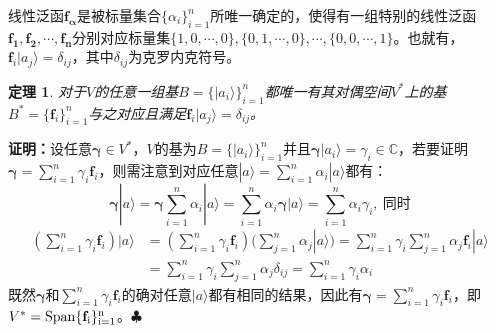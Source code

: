 \documentclass[mathserif,hyperref,UTF8,openany,b5paper]{ctexbook}
\newtheorem{thm}{定理}[section]
\begin{document}
线性泛函$\mathbf{f_\alpha}$是被标量集合$\{\alpha_i\}^n_{i=1}$所唯一确定的，使得有一组特别的线性泛函$\mathbf{f_1},\mathbf{f_2},\cdots,\mathbf{f_n}$分别对应标量集$\{1,0,\cdots,0\},\{0,1,\cdots,0\},\cdots,\{0,0,\cdots,1\}$。也就有，$\mathbf{f}_i|a_j\rangle=\delta_{ij}$，其中$\delta_{ij}$为克罗内克符号。
\begin{thm}
对于$V$的任意一组基$B=\{|a_i\rangle\}^n_{i=1}$都唯一有其对偶空间$V^*$上的基$B^*=\{\mathbf{f}_i\}^n_{i=1}$与之对应且满足$\mathbf{f}_i|a_j\rangle=\delta_{ij}$。
\end{thm}
\textbf{证明：}设任意$\boldsymbol{\gamma}\in V^*$，$V$的基为$B=\{|a_i\rangle\}^n_{i=1}$并且$\boldsymbol{\gamma}|a_i\rangle=\gamma_i\in \mathbb{C}$，若要证明$\boldsymbol{\gamma}=\sum^n_{i=1}\gamma_i\mathbf{f}_i$，则需注意到对应任意$|a\rangle=\sum^n_{i=1}\alpha_i|a\rangle$都有：
\begin{equation}
\boldsymbol{\gamma}|a\rangle =\boldsymbol{\gamma}\sum^n_{i=1}\alpha_i|a\rangle=\sum^n_{i=1}\alpha_i\boldsymbol{\gamma}|a\rangle=\sum^n_{i=1}\alpha_i\gamma_i,\ \mbox{同时}
\end{equation}\begin{align}
(\sum^n_{i=1}\gamma_i\mathbf{f}_i) |a\rangle &= (\sum^n_{i=1}\gamma_i\mathbf{f}_i)(\sum^n_{j=1}\alpha_j|a\rangle)=\sum^n_{i=1}\gamma_i\sum^n_{j=1}\alpha_j\mathbf{f}_i|a\rangle\\
&=\sum^n_{i=1}\gamma_i\sum^n_{j=1}\alpha_j\delta_{ij}=\sum^n_{i=1}\gamma_i\alpha_i
\end{align}
既然$\boldsymbol{\gamma}$和$\sum^n_{i=1}\gamma_i\mathbf{f}_i$的确对任意$|a\rangle$都有相同的结果，因此有$\boldsymbol{\gamma}=\sum^n_{i=1}\gamma_i\mathbf{f}_i$，即$V^*=\rm Span \{\mathbf{f}_i\}^n_{i=1}$。$\clubsuit$
\end{document}
